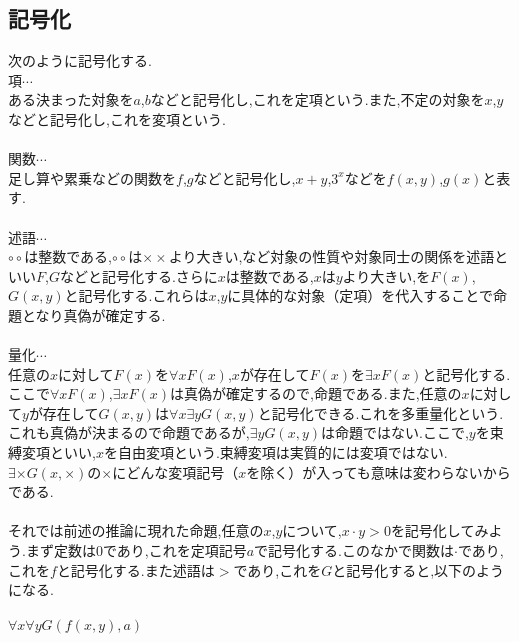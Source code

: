 \documentclass[10pt,b5paper,papersize,dvipdfmx]{jsbook}
\begin{document}
\subsection{記号化}
次のように記号化する. \\
項$\cdots$ \\
ある決まった対象を$a$,$b$などと記号化し,これを定項という.また,不定の対象を$x$,$y$などと記号化し,これを変項という. \\
\\
関数$\cdots$ \\
足し算や累乗などの関数を$f$,$g$などと記号化し,$x+y$,$3^x$などを$f(x,y)$,$g(x)$と表す. \\
\\
述語$\cdots$　\\
$\circ\circ$は整数である,$\circ\circ$は$\times\times$より大きい,など対象の性質や対象同士の関係を述語といい$F$,$G$などと記号化する.さらに$x$は整数である,$x$は$y$より大きい,を$F(x)$,$G(x,y)$と記号化する.これらは$x$,$y$に具体的な対象（定項）を代入することで命題となり真偽が確定する. \\
\\
量化$\cdots$ \\
任意の$x$に対して$F(x)$を$\forall xF(x)$,$x$が存在して$F(x)$を$\exists xF(x)$と記号化する.ここで$\forall xF(x)$,$\exists xF(x)$は真偽が確定するので,命題である.また,任意の$x$に対して$y$が存在して$G(x,y)$は$\forall x\exists yG(x,y)$と記号化できる.これを多重量化という.これも真偽が決まるので命題であるが,$\exists yG(x,y)$は命題ではない.ここで,$y$を束縛変項といい,$x$を自由変項という.束縛変項は実質的には変項ではない.$\exists \times G(x,\times)$の$\times$にどんな変項記号（$x$を除く）が入っても意味は変わらないからである.\\
\\
それでは前述の推論に現れた命題,任意の$x$,$y$について,$x\cdot y>0$を記号化してみよう.まず定数は$0$であり,これを定項記号$a$で記号化する.このなかで関数は$\cdot$であり,これを$f$と記号化する.また述語は$>$であり,これを$G$と記号化すると,以下のようになる.\\
\\
$\forall x\forall yG(f(x,y),a)$ \\
\end{document}
